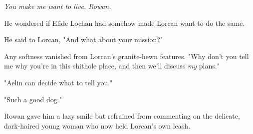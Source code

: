 \emph{You make me want to live, Rowan.}

He wondered if Elide Lochan had somehow made Lorcan want to do the same.

He said to Lorcan, "And what about your mission?"

Any softness vanished from Lorcan's granite-hewn features.
"Why don't you tell me why you're in this shithole place, and then we'll discuss \emph{my} plans."

"Aelin can decide what to tell you."

"Such a good dog."

Rowan gave him a lazy smile but refrained from commenting on the delicate, dark-haired young woman who now held Lorcan's own leash.
